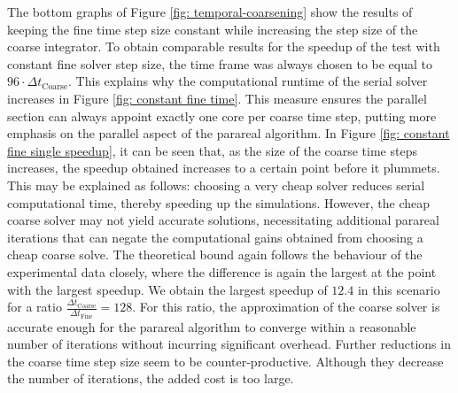 The bottom graphs of Figure \ref{fig: temporal-coarsening} show the results of keeping the fine time step size constant while increasing the step size of the coarse integrator. To obtain comparable results for the speedup of the test with constant fine solver step size, the time frame was always chosen to be equal to $96\cdot\Delta t_\mathrm{Coarse}$. This explains why the computational runtime of the serial solver increases in Figure \ref{fig: constant fine time}. This measure ensures the parallel section can always appoint exactly one core per coarse time step, putting more emphasis on the parallel aspect of the parareal algorithm. In Figure \ref{fig: constant fine single speedup}, it can be seen that, as the size of the coarse time steps increases, the speedup obtained increases to a certain point before it plummets. This may be explained as follows: choosing a very cheap solver reduces serial computational time, thereby speeding up the simulations. However, the cheap coarse solver may not yield accurate solutions, necessitating additional parareal iterations that can negate the computational gains obtained from choosing a cheap coarse solve. The theoretical bound again follows the behaviour of the experimental data closely, where the difference is again the largest at the point with the largest speedup. We obtain the largest speedup of $12.4$ in this scenario for a ratio $\frac{\Delta t_\mathrm{Coarse}}{\Delta t_\mathrm{Fine}}= 128$. 
For this ratio, the approximation of the coarse solver is accurate enough for the parareal algorithm to converge within a reasonable number of iterations without incurring significant overhead. Further reductions in the coarse time step size seem to be counter-productive. Although they decrease the number of iterations, the added cost is too large.

